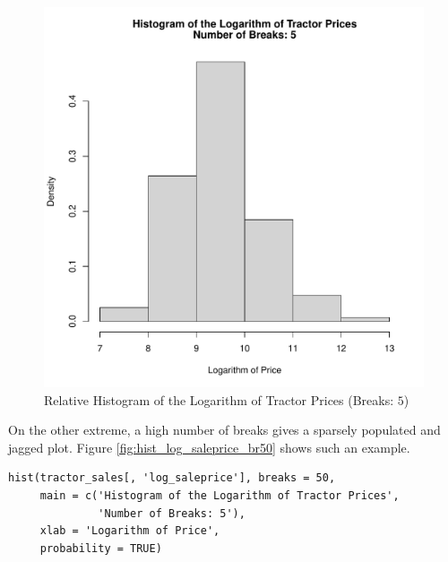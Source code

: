 \begin{figure}[h!]
  \centering
  \includegraphics[scale = 0.5, keepaspectratio=true]{../Figures/hist_log_saleprice_br5}
  \caption{Relative Histogram of the Logarithm of Tractor Prices (Breaks: $5$)} \label{fig:hist_log_saleprice_br5}
\end{figure}

On the other extreme,
a high number of breaks gives a sparsely populated
and jagged plot.
Figure \ref{fig:hist_log_saleprice_br50}
shows such an example.

\begin{verbatim}
hist(tractor_sales[, 'log_saleprice'], breaks = 50,
     main = c('Histogram of the Logarithm of Tractor Prices',
              'Number of Breaks: 5'),
     xlab = 'Logarithm of Price',
     probability = TRUE)
\end{verbatim}

